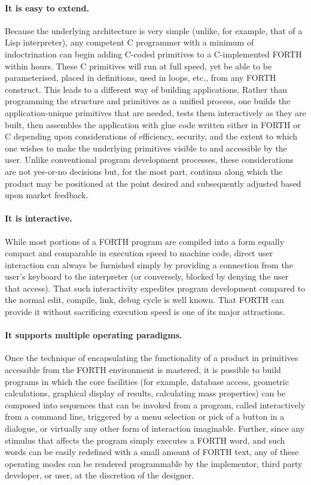 \documentclass[twocolumn]{article}
\begin{document}
\paragraph{It is easy to extend.}  Because the underlying architecture
is very simple (unlike, for example, that of a Lisp interpreter), any
competent C programmer with a minimum of indoctrination can begin
adding C-coded primitives to a C-implemented FORTH within hours.
These C primitives will run at full speed, yet be able to be
parameterised, placed in definitions, used in loops, etc., from any
FORTH construct.  This leads to a different way of building
applications.  Rather than programming the structure and primitives as a
unified process, one builds the application-unique primitives that are
needed, tests them interactively as they are built, then assembles the
application with glue code written either in FORTH or C
depending upon considerations of efficiency, security, and the extent
to which one wishes to make the underlying primitives visible to and
accessible by the user.  Unlike conventional program development
processes, these considerations are not yes-or-no decisions but, for
the most part, continua along which the product may be positioned at
the point desired and subsequently adjusted based upon market feedback.

\paragraph{It is interactive.}  While most portions of a FORTH program
are compiled into a form equally compact and comparable in execution
speed to machine code, direct user interaction can always be furnished
simply by providing a connection from the user's keyboard to the
interpreter (or conversely, blocked by denying the user that access).
That such interactivity expedites program development compared to the
normal edit, compile, link, debug cycle is well known.  That FORTH can
provide it without sacrificing execution speed is one of its major
attractions.

\paragraph{It supports multiple operating paradigms.}  Once the
technique of encapsulating the functionality of a product in
primitives accessible from the FORTH environment is mastered, it is
possible to build programs in which the core facilities (for example,
database access, geometric calculations, graphical display of results,
calculating mass properties) can be composed into sequences that can
be invoked from a program, called interactively from a command line,
triggered by a menu selection or pick of a button in a dialogue, or
virtually any other form of interaction imaginable.  Further, since
any stimulus that affects the program simply
executes a FORTH word, and such words can be easily redefined with a
small amount of FORTH text, any of these operating modes can be
rendered programmable by the implementor, third party developer, or
user, at the discretion of the designer.
\end{document}
